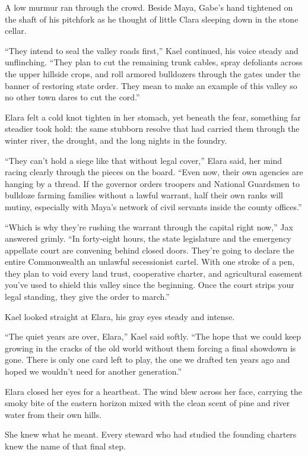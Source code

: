 A low murmur ran through the crowd. Beside Maya, Gabe’s hand tightened on the shaft of his pitchfork as he thought of little Clara sleeping down in the stone cellar.

``They intend to seal the valley roads first,'' Kael continued, his voice steady and unflinching. ``They plan to cut the remaining trunk cables, spray defoliants across the upper hillside crops, and roll armored bulldozers through the gates under the banner of restoring state order. They mean to make an example of this valley so no other town dares to cut the cord.''

Elara felt a cold knot tighten in her stomach, yet beneath the fear, something far steadier took hold: the same stubborn resolve that had carried them through the winter river, the drought, and the long nights in the foundry.

``They can't hold a siege like that without legal cover,'' Elara said, her mind racing clearly through the pieces on the board. ``Even now, their own agencies are hanging by a thread. If the governor orders troopers and National Guardsmen to bulldoze farming families without a lawful warrant, half their own ranks will mutiny, especially with Maya's network of civil servants inside the county offices.''

``Which is why they’re rushing the warrant through the capital right now,'' Jax answered grimly. ``In forty-eight hours, the state legislature and the emergency appellate court are convening behind closed doors. They’re going to declare the entire Commonwealth an unlawful secessionist cartel. With one stroke of a pen, they plan to void every land trust, cooperative charter, and agricultural easement you've used to shield this valley since the beginning. Once the court strips your legal standing, they give the order to march.''

Kael looked straight at Elara, his gray eyes steady and intense.

``The quiet years are over, Elara,'' Kael said softly. ``The hope that we could keep growing in the cracks of the old world without them forcing a final showdown is gone. There is only one card left to play, the one we drafted ten years ago and hoped we wouldn't need for another generation.''

Elara closed her eyes for a heartbeat. The wind blew across her face, carrying the smoky bite of the eastern horizon mixed with the clean scent of pine and river water from their own hills.

She knew what he meant. Every steward who had studied the founding charters knew the name of that final step.

